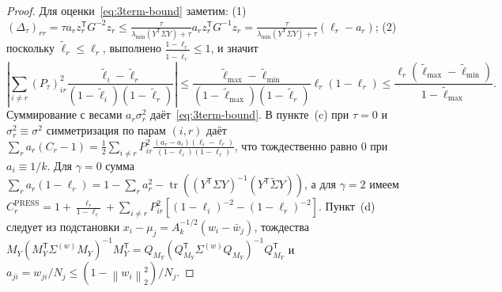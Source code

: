 \documentclass[11pt,a4paper]{article}
\numberwithin{equation}{section}
\theoremstyle{definition}
\theoremstyle{remark}
\newcommand{\tr}{\operatorname{tr}}
\newcommand{\T}{^{\mathsf T}}
\newcommand{\norm}[1]{\left\lVert #1 \right\rVert}
\newcommand{\abs}[1]{\left\lvert #1 \right\rvert}
\begin{document}
\begin{proof}
Для оценки~\eqref{eq:3term-bound} заметим:
(1) $(\Delta_\tau)_{rr} = \tau a_r z_r\T G^{-2} z_r \le \frac{\tau}{\lambda_{\min}(Y\T \Sigma Y) + \tau} a_r z_r\T G^{-1} z_r = \frac{\tau}{\lambda_{\min}(Y\T \Sigma Y) + \tau} (\ell_r - a_r)$;
(2) поскольку $\tilde\ell_r \le \ell_r$, выполнено $\frac{1 - \ell_r}{1 - \tilde\ell_r} \le 1$, и значит
\[
  \abs{\sum_{i \ne r} (P_\tau)_{ir}^2 \frac{\tilde\ell_i - \tilde\ell_r}{(1-\tilde\ell_i)(1-\tilde\ell_r)}}
  \le \frac{\tilde\ell_{\max} - \tilde\ell_{\min}}{(1 - \tilde\ell_{\max})(1 - \tilde\ell_r)} \ell_r(1 - \ell_r)
  \le \frac{\ell_r(\tilde\ell_{\max} - \tilde\ell_{\min})}{1 - \tilde\ell_{\max}}.
\]
Суммирование с весами $a_r \sigma_r^2$ даёт~\eqref{eq:3term-bound}.
В пункте~(c) при $\tau = 0$ и $\sigma_r^2 \equiv \sigma^2$ симметризация по парам $(i, r)$ даёт
$\sum_r a_r(C_r - 1) = \frac{1}{2}\sum_{i \ne r} P_{ir}^2 \frac{(a_r - a_i)(\ell_i - \ell_r)}{(1-\ell_i)(1-\ell_r)}$,
что тождественно равно $0$ при $a_i \equiv 1/k$. Для $\gamma=0$ сумма $\sum_r a_r(1 - \ell_r) = 1 - \sum_r a_r^2 - \tr((Y\T\Sigma Y)^{-1}(Y\T\widetilde{\Sigma} Y))$,
а для $\gamma=2$ имеем $C_r^{\mathrm{PRESS}} = 1 + \frac{\ell_r}{1-\ell_r} + \sum_{i\ne r} P_{ir}^2[(1-\ell_i)^{-2} - (1-\ell_r)^{-2}]$.
Пункт~(d) следует из подстановки $x_i - \mu_j = A_k^{-1/2}(w_i - \bar{w}_j)$, тождества
$M_Y (M_Y\T \Sigma^{(w)} M_Y)^{-1} M_Y\T = Q_{M_Y} (Q_{M_Y}\T \Sigma^{(w)} Q_{M_Y})^{-1} Q_{M_Y}\T$
и $a_{ji} = w_{ji}/N_j \le (1 - \norm{w_i}_2^2)/N_j$.
\end{proof}
\end{document}
